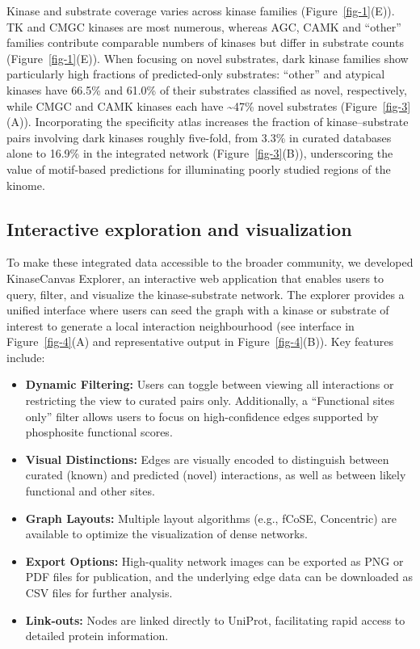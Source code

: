 \documentclass[
  number,
  preprint,
  onecolumn]{elsarticle}
\providecommand{\tightlist}{%
  \setlength{\itemsep}{0pt}\setlength{\parskip}{0pt}}
\begin{document}
Kinase and substrate coverage varies across kinase families
(Figure~\ref{fig-1}(E)). TK and CMGC kinases are most numerous, whereas
AGC, CAMK and ``other'' families contribute comparable numbers of
kinases but differ in substrate counts (Figure~\ref{fig-1}(E)). When
focusing on novel substrates, dark kinase families show particularly
high fractions of predicted-only substrates: ``other'' and atypical
kinases have 66.5\% and 61.0\% of their substrates classified as novel,
respectively, while CMGC and CAMK kinases each have \textasciitilde47\%
novel substrates (Figure~\ref{fig-3}(A)). Incorporating the specificity
atlas increases the fraction of kinase--substrate pairs involving dark
kinases roughly five-fold, from 3.3\% in curated databases alone to
16.9\% in the integrated network (Figure~\ref{fig-3}(B)), underscoring
the value of motif-based predictions for illuminating poorly studied
regions of the kinome.

\subsection{Interactive exploration and
visualization}\label{interactive-exploration-and-visualization}

To make these integrated data accessible to the broader community, we
developed KinaseCanvas Explorer, an interactive web application that
enables users to query, filter, and visualize the kinase-substrate
network. The explorer provides a unified interface where users can seed
the graph with a kinase or substrate of interest to generate a local
interaction neighbourhood (see interface in Figure~\ref{fig-4}(A) and
representative output in Figure~\ref{fig-4}(B)). Key features include:

\begin{itemize}
\tightlist
\item
  \textbf{Dynamic Filtering:} Users can toggle between viewing all
  interactions or restricting the view to curated pairs only.
  Additionally, a ``Functional sites only'' filter allows users to focus
  on high-confidence edges supported by phosphosite functional scores.
\item
  \textbf{Visual Distinctions:} Edges are visually encoded to
  distinguish between curated (known) and predicted (novel)
  interactions, as well as between likely functional and other sites.
\item
  \textbf{Graph Layouts:} Multiple layout algorithms (e.g., fCoSE,
  Concentric) are available to optimize the visualization of dense
  networks.
\item
  \textbf{Export Options:} High-quality network images can be exported
  as PNG or PDF files for publication, and the underlying edge data can
  be downloaded as CSV files for further analysis.
\item
  \textbf{Link-outs:} Nodes are linked directly to UniProt, facilitating
  rapid access to detailed protein information.
\end{itemize}
\end{document}
